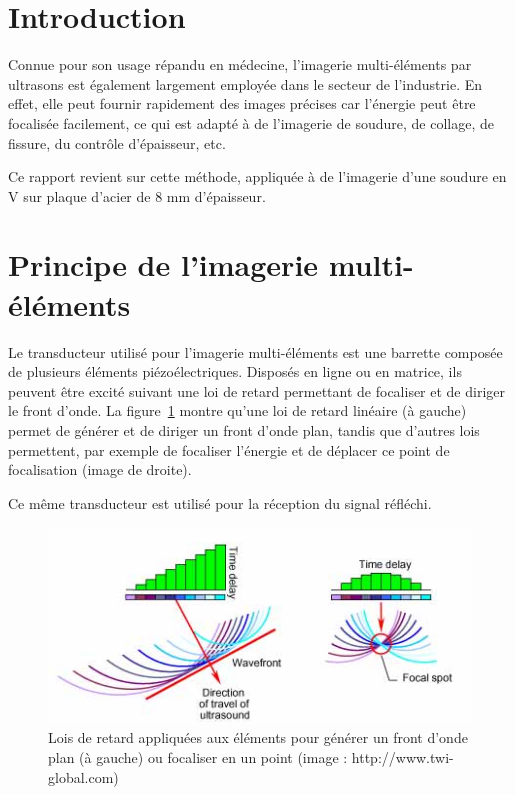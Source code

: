 \documentclass[twoside]{article}
\begin{document}
\begin{multicols}{2} %

\section{Introduction}

Connue pour son usage répandu en médecine, l'imagerie multi-éléments par ultrasons est également largement employée dans le secteur de l'industrie. En effet, elle peut fournir rapidement des images précises car l'énergie peut être focalisée facilement, ce qui est adapté à de l'imagerie de soudure, de collage, de fissure, du contrôle d'épaisseur, etc. 

Ce rapport revient sur cette méthode, appliquée à de l'imagerie d'une soudure en V sur plaque d'acier de 8 mm d'épaisseur.

\section{Principe de l'imagerie multi-éléments}

Le transducteur utilisé pour l'imagerie multi-éléments est une barrette composée de plusieurs éléments piézoélectriques. Disposés en ligne ou en matrice, ils peuvent être excité suivant une loi de retard permettant de focaliser et de diriger le front d'onde. La figure~\ref{multielements} montre qu'une loi de retard linéaire (à gauche) permet de générer et de diriger un front d'onde plan, tandis que d'autres lois permettent, par exemple de focaliser l'énergie et de déplacer ce point de focalisation (image de droite).

Ce même transducteur est utilisé pour la réception du signal réfléchi.

\begin{figure}[H]
	\includegraphics[scale=0.5]{images/principe.jpg}
		\caption{Lois de retard appliquées aux éléments pour générer un front d'onde plan (à gauche) ou focaliser en un point (image : http://www.twi-global.com)\label{multielements}}
\end{figure}


\end{multicols}
\end{document}
